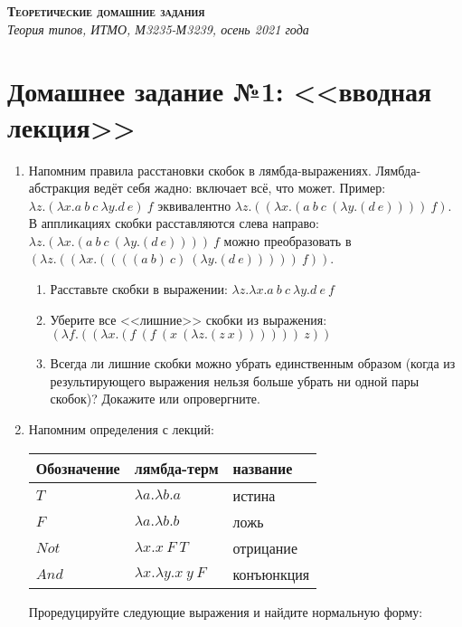\documentclass[10pt,a4paper,oneside]{article}
\begin{document}
\begin{center}{\Large\textsc{\textbf{Теоретические домашние задания}}}\\
             \it Теория типов, ИТМО, М3235-М3239, осень 2021 года\end{center}

\section*{Домашнее задание №1: <<вводная лекция>>}

\begin{enumerate}

\item Напомним правила расстановки скобок в лямбда-выражениях. Лямбда-абстракция ведёт себя жадно: 
включает всё, что может. Пример: $\lambda z.(\lambda x.a\ b\ c\ \lambda y.d\ e)\ f$ 
эквивалентно $\lambda z.((\lambda x.(a\ b\ c\ (\lambda y.(d\ e))))\ f)$.
В аппликациях скобки расставляются слева направо:
$\lambda z.(\lambda x.(a\ b\ c\ (\lambda y.(d\ e))))\ f$ можно преобразовать в  
$(\lambda z.((\lambda x.((((a\ b)\ c)\ (\lambda y.(d\ e)))))\ f))$.

\begin{enumerate}
\item Расставьте скобки в выражении:
$\lambda z.\lambda x.a\ b\ c\ \lambda y.d\ e\ f$
\item Уберите все <<лишние>> скобки из выражения:
$(\lambda f.((\lambda x.(f\ (f\ (x\ (\lambda z.(z\ x))))))\ z))$
\item Всегда ли лишние скобки можно убрать единственным образом (когда из результирующего
выражения нельзя больше убрать ни одной пары скобок)? Докажите или опровергните.
\end{enumerate}

\item Напомним определения с лекций:

\begin{tabular}{lll}
Обозначение & лямбда-терм & название\\\hline
$T$ & $\lambda a.\lambda b.a$ & истина\\
$F$ & $\lambda a.\lambda b.b$ & ложь\\
$Not$ & $\lambda x.x\ F\ T$ & отрицание\\
$And$ & $\lambda x.\lambda y.x\ y\ F$ & конъюнкция
\end{tabular}

Проредуцируйте следующие выражения и найдите нормальную форму:


\end{enumerate}
\end{document}
